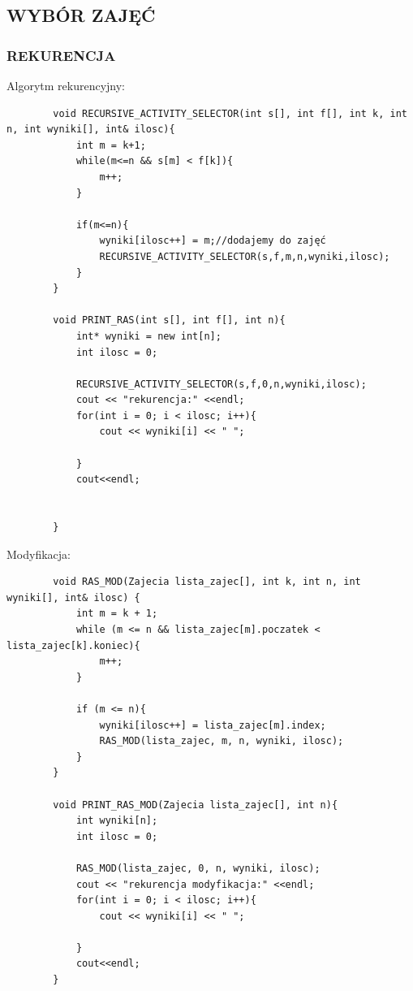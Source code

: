\documentclass{article}
\begin{document}
	\subsection*{WYBÓR ZAJĘĆ}
	\subsubsection*{REKURENCJA}
	Algorytm rekurencyjny:
	\begin{verbatim}
		void RECURSIVE_ACTIVITY_SELECTOR(int s[], int f[], int k, int n, int wyniki[], int& ilosc){
			int m = k+1;
			while(m<=n && s[m] < f[k]){
				m++;
			}
			
			if(m<=n){
				wyniki[ilosc++] = m;//dodajemy do zajęć
				RECURSIVE_ACTIVITY_SELECTOR(s,f,m,n,wyniki,ilosc);
			}
		}
		
		void PRINT_RAS(int s[], int f[], int n){
			int* wyniki = new int[n];
			int ilosc = 0;
			
			RECURSIVE_ACTIVITY_SELECTOR(s,f,0,n,wyniki,ilosc);
			cout << "rekurencja:" <<endl;
			for(int i = 0; i < ilosc; i++){
				cout << wyniki[i] << " ";
				
			}
			cout<<endl;
			
			
		}
	\end{verbatim}
	Modyfikacja:
	\begin{verbatim}
		void RAS_MOD(Zajecia lista_zajec[], int k, int n, int wyniki[], int& ilosc) {
			int m = k + 1;
			while (m <= n && lista_zajec[m].poczatek < lista_zajec[k].koniec){
				m++;
			}
			
			if (m <= n){
				wyniki[ilosc++] = lista_zajec[m].index; 
				RAS_MOD(lista_zajec, m, n, wyniki, ilosc); 
			}
		}
		
		void PRINT_RAS_MOD(Zajecia lista_zajec[], int n){
			int wyniki[n];
			int ilosc = 0;
			
			RAS_MOD(lista_zajec, 0, n, wyniki, ilosc);
			cout << "rekurencja modyfikacja:" <<endl;
			for(int i = 0; i < ilosc; i++){
				cout << wyniki[i] << " ";
				
			}
			cout<<endl;    
		}
	\end{verbatim}
\end{document}
